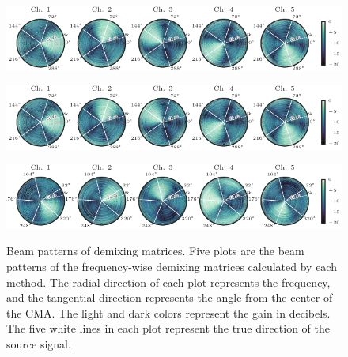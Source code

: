 \documentclass[sip,biber]{now-journal}
\begin{document}
\begin{figure}[t]
  \centering
  \begin{minipage}[t]{\linewidth}
    \centering\includegraphics{figures/plots/beam-pattern/sfiiva-cov_ref.pdf}\label{fig:plot:bp:ref}
  \end{minipage}
  \begin{minipage}[t]{\linewidth}
    \centering\includegraphics{figures/plots/beam-pattern/sfiiva-obs_rot.pdf}\label{fig:plot:bp:sfiivao}
  \end{minipage}
  \begin{minipage}[t]{\linewidth}
    \centering\includegraphics{figures/plots/beam-pattern/sfiiva-cov_rot.pdf}\label{fig:plot:bp:sfiivam}
  \end{minipage}
  \caption{%
    Beam patterns of demixing matrices.
    Five plots are the beam patterns of the frequency-wise demixing matrices calculated by each method.
    The radial direction of each plot represents the frequency, and the tangential direction represents the angle from the center of the CMA.
    The light and dark colors represent the gain in decibels.
    The five white lines in each plot represent the true direction of the source signal.
  }%
  \label{fig:plot:beam}
\end{figure}
\end{document}
